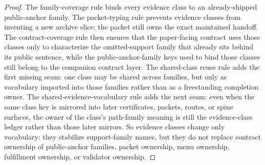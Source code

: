 \documentclass[11pt]{article}
\begin{document}
\begin{proof}
The family-coverage rule binds every evidence class to an already-shipped public-anchor family.
The packet-typing rule prevents evidence classes from inventing a new archive slice; the packet still owns the exact maintained handoff.
The contract-coverage rule then ensures that the paper-facing contract uses those classes only to characterize the omitted-support family that already sits behind its public sentence, while the public-anchor-family keys used to bind those classes still belong to the companion contract layer. The shared-class reuse rule adds the first missing seam: one class may be shared across families, but only as vocabulary imported into those families rather than as a freestanding completion owner. The shared-evidence-vocabulary rule adds the next seam: even when the same class key is mirrored into later certificates, packets, routes, or spine surfaces, the owner of the class's path-family meaning is still the evidence-class ledger rather than those later mirrors.
So evidence classes change only vocabulary: they stabilize support-family names, but they do not replace contract ownership of public-anchor families, packet ownership, menu ownership, fulfillment ownership, or validator ownership.\qedhere
\end{proof}
\end{document}
